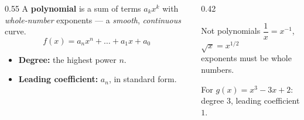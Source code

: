 \documentclass[aspectratio=169, 11pt]{beamer}
\begin{document}
\begin{frame}[t, plain]
  \begin{columns}[T]
    \begin{column}{0.55\textwidth}
      A \textbf{polynomial} is a sum of terms $a_kx^k$ with \emph{whole-number} exponents ---
      a \emph{smooth}, \emph{continuous} curve.
      \[ f(x)=a_nx^n+\dots+a_1x+a_0 \]
      \begin{itemize}\setlength{\itemsep}{4pt}
        \item \textbf{Degree:} the highest power $n$.
        \item \textbf{Leading coefficient:} $a_n$, in standard form.
      \end{itemize}
    \end{column}
    \begin{column}{0.42\textwidth}
      \begin{block}{Not polynomials}
        $\dfrac{1}{x}=x^{-1}$, \quad $\sqrt{x}=x^{1/2}$ \\[3pt]
        {\footnotesize exponents must be whole numbers.}
      \end{block}
      \vspace{2pt}
      {\footnotesize For $g(x)=x^3-3x+2$: degree $3$, leading coefficient $1$.}
    \end{column}
  \end{columns}
\end{frame}
\end{document}
